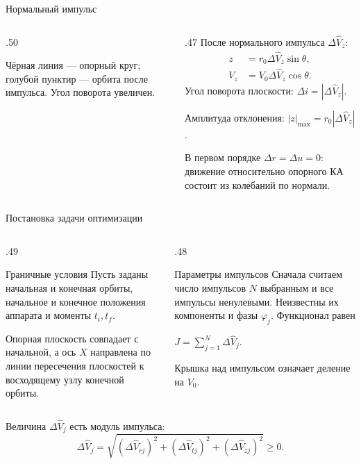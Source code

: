 \documentclass[11pt,aspectratio=169,t]{beamer}
\newcommand{\eqcompact}{\fontsize{10}{12}\selectfont}
\newcommand{\figcaption}[1]{{\usebeamerfont{caption}\color{coursemuted}#1\par}}
\begin{document}
\begin{frame}{Нормальный импульс}
\relax
\begin{columns}[T,onlytextwidth]
\begin{column}{.50\textwidth}
\centering
\figcaption{Чёрная линия --- опорный круг; голубой пунктир --- орбита после импульса. Угол поворота увеличен.}
\end{column}
\begin{column}{.47\textwidth}
После нормального импульса $\Delta\widehat V_z$:
{\eqcompact
\setlength{\abovedisplayskip}{3pt}\setlength{\belowdisplayskip}{3pt}
\[
 \begin{aligned}
 z&=r_0{\Delta\widehat V_z}\sin\theta,\\
 V_z&=V_0{\Delta\widehat V_z}\cos\theta.
 \end{aligned}
\]
}
Угол поворота плоскости: $\Delta i=|\Delta\widehat V_z|$.
\smallskip

Амплитуда отклонения: $|z|_{\max}=r_0|{\Delta\widehat V_z}|$.
\smallskip

{\justifying
В первом порядке $\Delta r=\Delta u=0$: движение относительно опорного КА состоит из колебаний по нормали.\par}

\end{column}
\end{columns}
\end{frame}

\begin{frame}{Постановка задачи оптимизации}
\relax
\derivationmathspacing
\begin{columns}[T,onlytextwidth]
\begin{column}{.49\textwidth}
\begin{block}{Граничные условия}
\justifying
Пусть заданы начальная и конечная орбиты, начальное и конечное
положения аппарата и моменты $t_i,t_f$.
\par\smallskip
Опорная плоскость совпадает с начальной, а ось $X$ направлена
по линии пересечения плоскостей к восходящему узлу конечной орбиты.
\end{block}
\end{column}
\begin{column}{.48\textwidth}
\begin{block}{Параметры импульсов}
\justifying
Сначала считаем число импульсов $N$ выбранным и все импульсы
ненулевыми. Неизвестны их компоненты и фазы $\varphi_j$.
Функционал равен\par
{\centering$\displaystyle J=\sum\nolimits_{j=1}^N\Delta\widehat V_j.$\par}
Крышка над импульсом означает деление на $V_0$.
\end{block}
\end{column}
\end{columns}
Величина $\Delta\widehat V_j$ есть модуль импульса:
{\eqcompact\derivationmathspacing
\[
 \Delta\widehat V_j=
 \sqrt{(\Delta\widehat V_{rj})^2+(\Delta\widehat V_{tj})^2+
                         (\Delta\widehat V_{zj})^2}\geq0.
\]
}
\end{frame}
\end{document}
